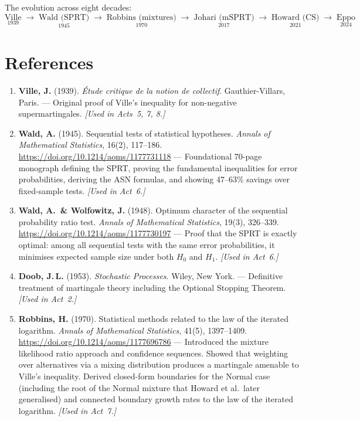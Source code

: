 \documentclass[12pt, a4paper]{article}
\begin{document}
The evolution across eight decades:
\[
  \underset{1939}{\text{Ville}}
  \;\to\;
  \underset{1945}{\text{Wald (SPRT)}}
  \;\to\;
  \underset{1970}{\text{Robbins (mixtures)}}
  \;\to\;
  \underset{2017}{\text{Johari (mSPRT)}}
  \;\to\;
  \underset{2021}{\text{Howard (CS)}}
  \;\to\;
  \underset{2024}{\text{Eppo}}
\]


\newpage
\section{References}
\label{sec:references}

\begin{enumerate}
  \item \textbf{Ville, J.} (1939).
        \textit{\'Etude critique de la notion de collectif}.
        Gauthier-Villars, Paris.
        --- Original proof of Ville's inequality for non-negative
        supermartingales.
        \textit{[Used in Acts~5, 7, 8.]}

  \item \textbf{Wald, A.} (1945).
        Sequential tests of statistical hypotheses.
        \textit{Annals of Mathematical Statistics}, 16(2), 117--186.
        \url{https://doi.org/10.1214/aoms/1177731118}
        --- Foundational 70-page monograph defining the SPRT, proving
        the fundamental inequalities for error probabilities, deriving the
        ASN formulas, and showing 47--63\% savings over fixed-sample tests.
        \textit{[Used in Act~6.]}

  \item \textbf{Wald, A.\ \& Wolfowitz, J.} (1948).
        Optimum character of the sequential probability ratio test.
        \textit{Annals of Mathematical Statistics}, 19(3), 326--339.
        \url{https://doi.org/10.1214/aoms/1177730197}
        --- Proof that the SPRT is exactly optimal: among all sequential tests
        with the same error probabilities, it minimises expected sample size
        under both $H_0$ and $H_1$.
        \textit{[Used in Act~6.]}

  \item \textbf{Doob, J.\,L.} (1953).
        \textit{Stochastic Processes}.
        Wiley, New York.
        --- Definitive treatment of martingale theory including the
        Optional Stopping Theorem.
        \textit{[Used in Act~2.]}

  \item \textbf{Robbins, H.} (1970).
        Statistical methods related to the law of the iterated logarithm.
        \textit{Annals of Mathematical Statistics}, 41(5), 1397--1409.
        \url{https://doi.org/10.1214/aoms/1177696786}
        --- Introduced the mixture likelihood ratio approach and confidence
        sequences.  Showed that weighting over alternatives via a mixing
        distribution produces a martingale amenable to Ville's inequality.
        Derived closed-form boundaries for the Normal case (including the root
        of the Normal mixture that Howard et al.\ later generalised) and
        connected boundary growth rates to the law of the iterated logarithm.
        \textit{[Used in Act~7.]}


\end{enumerate}
\end{document}
